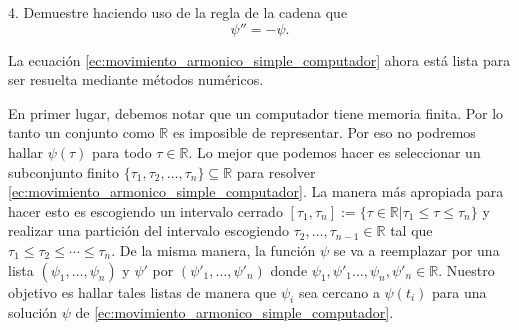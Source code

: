 \documentclass{article}
\begin{document}
4. Demuestre haciendo uso de la regla de la cadena que
\begin{equation}\label{ec:movimiento_armonico_simple_computador}
\psi''=-\psi.
\end{equation}

La ecuación \eqref{ec:movimiento_armonico_simple_computador} ahora está lista para ser resuelta mediante métodos numéricos.

En primer lugar, debemos notar que un computador tiene memoria finita. Por lo tanto un conjunto como $\mathbb{R}$ es imposible de representar. Por eso no podremos hallar $\psi(\tau)$ para todo $\tau\in\mathbb{R}$. Lo mejor que podemos hacer es seleccionar un subconjunto finito $\{\tau_1,\tau_2,\dots,\tau_n\}\subseteq\mathbb{R}$ para resolver \eqref{ec:movimiento_armonico_simple_computador}. La manera más apropiada para hacer esto es escogiendo un intervalo cerrado $[\tau_1,\tau_n ]:=\{\tau\in\mathbb{R}|\tau_1\leq\tau\leq\tau_n\}$ y realizar una partición del intervalo escogiendo $\tau_2,\dots,\tau_{n-1}\in\mathbb{R}$ tal que $\tau_1\leq\tau_2\leq\cdots\leq\tau_n$. De la misma manera, la función $\psi$ se va a reemplazar por una lista $(\psi_1,\dots,\psi_n)$ y $\psi'$ por $(\psi'_1,\dots,\psi'_n)$ donde $\psi_1,\psi'_1\dots,\psi_n,\psi'_n\in\mathbb{R}$. Nuestro objetivo es hallar tales listas de manera que $\psi_i$ sea cercano a $\psi(t_i)$ para una solución $\psi$ de \eqref{ec:movimiento_armonico_simple_computador}.
\end{document}

